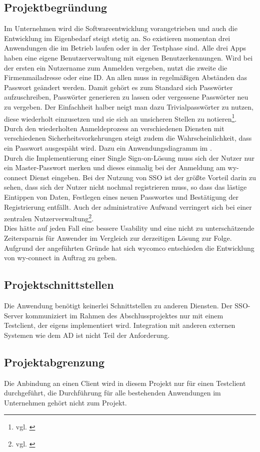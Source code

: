 \subsection{Projektbegründung} 
\label{sec:Projektbegruendung}
Im Unternehmen wird die Softwareentwicklung vorangetrieben und auch die Entwicklung im Eigenbedarf steigt stetig an. So existieren momentan drei Anwendungen die im Betrieb laufen oder in der Testphase sind. Alle drei Apps haben eine eigene Benutzerverwaltung mit eigenen Benutzerkennungen. Wird bei der ersten ein Nutzername zum Anmelden vergeben, nutzt die zweite die Firmenmailadresse oder eine ID. 
An allen muss in regelmäßigen Abständen das Passwort geändert werden. 
Damit gehört es zum Standard sich Passwörter aufzuschreiben, Passwörter generieren zu lassen oder vergessene Passwörter neu zu vergeben. Der Einfachheit halber neigt man dazu Trivialpasswörter zu nutzen, diese wiederholt einzusetzen und sie sich an unsicheren Stellen zu notieren\footnote{vgl. \cite{datenschutzbeauftragter}}. 
Durch den wiederholten Anmeldeprozess an verschiedenen Diensten mit verschiedenen Sicherheitsvorkehrungen steigt zudem die Wahrscheinlichkeit, dass ein Passwort ausgespäht wird. 
Dazu ein Anwendungsdiagramm im . \\
Durch die Implementierung einer Single Sign-on-Lösung muss sich der Nutzer nur ein Master-Passwort merken und dieses einmalig bei der Anmeldung am wy-connect Dienst eingeben. Bei der Nutzung von \ac{SSO} ist der größte Vorteil darin zu sehen, dass sich der Nutzer nicht nochmal registrieren muss, so dass das lästige Eintippen von Daten, Festlegen eines neuen Passwortes und Bestätigung der Registrierung entfällt. Auch der administrative Aufwand verringert sich bei einer zentralen Nutzerverwaltung\footnote{vgl. \cite{univention}}.\\
Dies hätte auf jeden Fall eine bessere Usability und eine nicht zu unterschätzende Zeitersparnis für Anwender im Vergleich zur derzeitigen Lösung zur Folge. 
Aufgrund der angeführten Gründe hat sich wycomco entschieden die Entwicklung von wy-connect in Auftrag zu geben.
\subsection{Projektschnittstellen} 
\label{sec:Projektschnittstellen}
Die Anwendung benötigt keinerlei Schnittstellen zu anderen Diensten. Der \ac{SSO}-Server kommuniziert im Rahmen des Abschlussprojektes nur mit einem Testclient, der eigens implementiert wird.
Integration mit anderen externen Systemen wie dem \ac{AD} ist nicht Teil der Anforderung.
\subsection{Projektabgrenzung} 
\label{sec:Projektabgrenzung}
Die Anbindung an einen Client wird in diesem Projekt nur für einen Testclient durchgeführt, die Durchführung für alle bestehenden Anwendungen im Unternehmen gehört nicht zum Projekt.